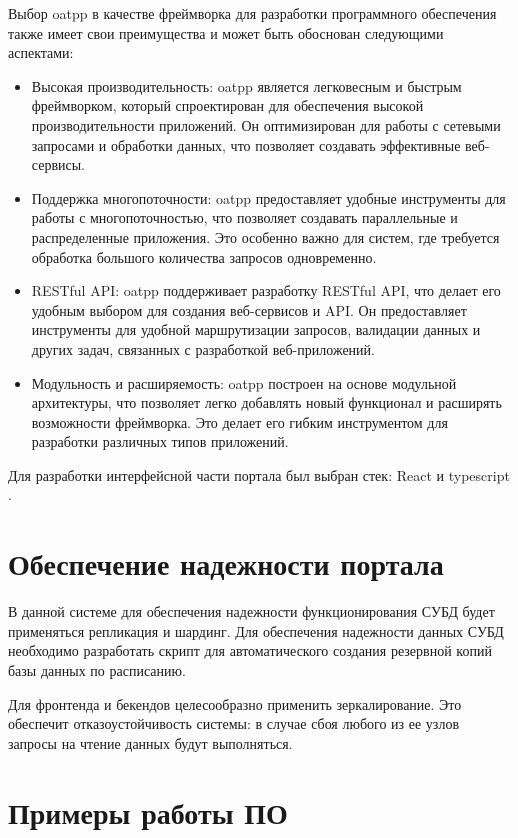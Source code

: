 Выбор oatpp \cite{bib:oat} в качестве фреймворка для разработки программного обеспечения также имеет свои преимущества и может быть обоснован следующими аспектами:
\begin{itemize}
    \item Высокая производительность: oatpp является легковесным и быстрым фреймворком, который спроектирован для обеспечения высокой производительности приложений. Он оптимизирован для работы с сетевыми запросами и обработки данных, что позволяет создавать эффективные веб-сервисы.
    \item Поддержка многопоточности: oatpp предоставляет удобные инструменты для работы с многопоточностью, что позволяет создавать параллельные и распределенные приложения. Это особенно важно для систем, где требуется обработка большого количества запросов одновременно.
    \item RESTful API: oatpp поддерживает разработку RESTful API, что делает его удобным выбором для создания веб-сервисов и API. Он предоставляет инструменты для удобной маршрутизации запросов, валидации данных и других задач, связанных с разработкой веб-приложений.
    \item Модульность и расширяемость: oatpp построен на основе модульной архитектуры, что позволяет легко добавлять новый функционал и расширять возможности фреймворка. Это делает его гибким инструментом для разработки различных типов приложений.
\end{itemize} 

Для разработки интерфейсной части портала был выбран стек: React \cite{bib:react} и typescript \cite{bib:typescript}.

\section{Обеспечение надежности портала}


В данной системе для обеспечения надежности функционирования СУБД будет применяться репликация и шардинг. Для обеспечения надежности данных СУБД необходимо разработать скрипт для автоматического создания резервной копий базы данных по расписанию.

Для фронтенда и бекендов целесообразно применить зеркалирование. Это обеспечит отказоустойчивость системы: в случае сбоя любого из ее узлов запросы на чтение данных будут выполняться. 

\section{Примеры работы ПО}

